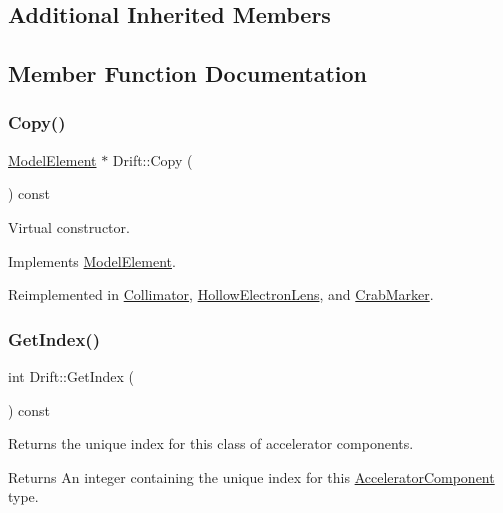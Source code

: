 \subsection*{Additional Inherited Members}


\subsection{Member Function Documentation}
\mbox{\label{classDrift_ae47df31297596e13944364d602c95ce5}} 
\subsubsection{\texorpdfstring{Copy()}{Copy()}}
{\footnotesize\ttfamily \hyperlink{classModelElement}{Model\+Element} $\ast$ Drift\+::\+Copy (\begin{DoxyParamCaption}{ }\end{DoxyParamCaption}) const\hspace{0.3cm}{\ttfamily [virtual]}}

Virtual constructor. 

Implements \hyperlink{classModelElement_ac3ca26d649bd86a0f31a58ae09941429}{Model\+Element}.



Reimplemented in \hyperlink{classCollimator_a82e63d47e1688d84f2e8f2fc3d247700}{Collimator}, \hyperlink{classHollowElectronLens_a95d48cbadab7dcc58a1d4c1d9895e8d3}{Hollow\+Electron\+Lens}, and \hyperlink{classCrabMarker_acd6d5d5a310e985f191443b42d8abc72}{Crab\+Marker}.

\mbox{\label{classDrift_a19bc19d48348912f8693e3ebbf9e92f2}} 
\subsubsection{\texorpdfstring{Get\+Index()}{GetIndex()}}
{\footnotesize\ttfamily int Drift\+::\+Get\+Index (\begin{DoxyParamCaption}{ }\end{DoxyParamCaption}) const\hspace{0.3cm}{\ttfamily [virtual]}}

Returns the unique index for this class of accelerator components. \begin{DoxyReturn}{Returns}
An integer containing the unique index for this \hyperlink{classAcceleratorComponent}{Accelerator\+Component} type. 
\end{DoxyReturn}


